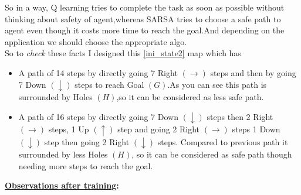 \documentclass[journal,12pt,onecolumn]{IEEEtran}
\theoremstyle{remark}
\numberwithin{equation}{section}
\begin{document}
So in a way, Q learning tries to complete the task as soon as possible without thinking about safety of agent,whereas SARSA tries to choose a safe path to agent even though it costs more time to reach the goal.And depending on the application we should choose the appropriate algo. \\
So to \emph{check} these facts I designed this \ref{ini_state2} map which has 
       \begin{itemize}
	 \item A path of 14 steps by directly going 7 Right $(\rightarrow)$ steps and then by going 7 Down $(\downarrow)$ steps to reach Goal $(G)$.As you can see this path is surrounded by Holes $(H)$,so it can be considered as less safe path.
         \item A path of 16 steps by directly going 7 Down $(\downarrow)$ steps then 2 Right $(\rightarrow)$ steps, 1 Up $(\uparrow)$ step and going 2 Right $(\rightarrow)$ steps 1 Down $(\downarrow)$ step then going 2 Right $(\downarrow)$ steps. Compared to previous path it surrounded by less Holes $(H)$, so it can be considered as safe path though needing more steps to reach the goal.
       \end{itemize}
       \textbf{\underline{Observations after training}:}
\end{document}
